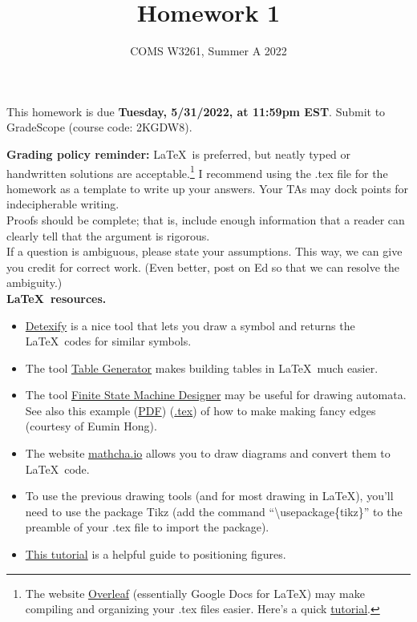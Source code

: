 \documentclass{../homework}
\title{Homework 1}
\date{COMS W3261, Summer A 2022}
\begin{document}
\maketitle

This homework is due \textbf{Tuesday, 5/31/2022, at 11:59pm EST}. Submit to GradeScope (course code: 2KGDW8).

\textbf{Grading policy reminder:} \LaTeX~is preferred, but neatly typed or handwritten solutions are acceptable.\footnote{The website \href{https://www.overleaf.com/}{Overleaf} (essentially Google Docs for LaTeX) may make compiling and organizing your .tex files easier. Here's a quick \href{https://www.overleaf.com/learn/latex/Learn_LaTeX_in_30_minutes}{tutorial}.} I recommend using the .tex file for the homework as a template to write up your answers. Your TAs may dock points for indecipherable writing.\\

Proofs should be complete; that is, include enough information that a reader can clearly tell that the argument is rigorous. \\

If a question is ambiguous, please state your assumptions. This way, we can give you credit for correct work. (Even better, post on Ed so that we can resolve the ambiguity.) \\

\textbf{\LaTeX~resources.}
\begin{itemize}
    \item \href{https://detexify.kirelabs.org/classify.html}{Detexify} is a nice tool that lets you draw a symbol and returns the \LaTeX~codes for similar symbols. 
    \item The tool \href{https://www.tablesgenerator.com/}{Table Generator} makes building tables in \LaTeX~much easier.
    \item The tool \href{http://madebyevan.com/fsm/}{Finite State Machine Designer} may be useful for drawing automata. See also this example (\href{https://static.us.edusercontent.com/files/HZeTXimODzWeLvHIqsvjL2BG}{PDF}) (\href{https://static.us.edusercontent.com/files/RI3W8tQNvHMWFe9MkXV1KztA}{.tex}) of how to make making fancy edges (courtesy of Eumin Hong).
    \item The website \href{https://www.mathcha.io/}{mathcha.io} allows you to draw diagrams and convert them to \LaTeX~code.
    \item To use the previous drawing tools (and for most drawing in \LaTeX), you'll need to use the package Tikz (add the command ``\textbackslash usepackage\{tikz\}'' to the preamble of your .tex file to import the package). 
    \item \href{https://www.overleaf.com/learn/latex/Positioning_of_Figures}{This tutorial} is a helpful guide to positioning figures.
\end{itemize}  
\end{document}

